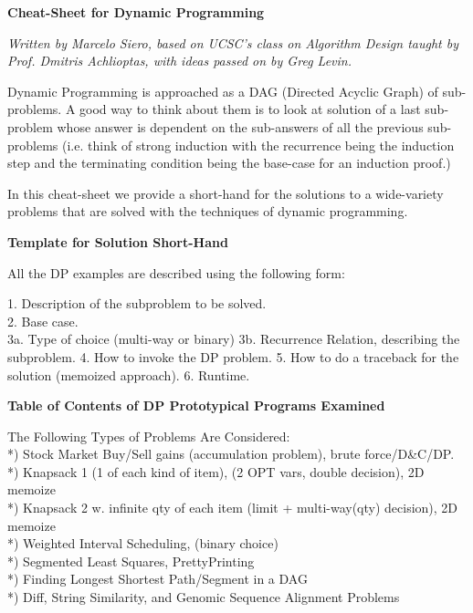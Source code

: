 
{\bf \huge Cheat-Sheet for Dynamic Programming} 

{\small \em Written by Marcelo Siero, based on UCSC's class on Algorithm Design
taught by Prof. Dmitris Achlioptas, with ideas passed on by Greg Levin.}

Dynamic Programming is approached as a DAG (Directed Acyclic Graph) of sub-problems.  
A good way to think about them is to look at solution of a last sub-problem whose 
answer is dependent on the sub-answers of all the previous sub-problems (i.e. think 
of strong induction with the recurrence being the induction step and the terminating 
condition being the base-case for an induction proof.)

In this cheat-sheet we provide a short-hand for the solutions to a wide-variety
problems that are solved with the techniques of dynamic programming.
   

{\bf \Large Template for Solution Short-Hand }

All the DP examples are described using the following form:

1. Description of the subproblem to be solved.\\
2. Base case.\\
3a. Type of choice (multi-way or binary)
3b. Recurrence Relation, describing the subproblem.
4. How to invoke the DP problem.
5. How to do a traceback for the solution (memoized approach).
6. Runtime. 

{\bf \Large Table of Contents of DP Prototypical Programs Examined}

The Following Types of Problems Are Considered:\\

*) Stock Market Buy/Sell gains (accumulation problem), brute force/D\&C/DP.\\
*) Knapsack 1 (1 of each kind of item), (2 OPT vars, double decision), 2D memoize\\
*) Knapsack 2 w. infinite qty of each item (limit + multi-way(qty) decision), 2D memoize\\
*) Weighted Interval Scheduling, (binary choice)\\
*) Segmented Least Squares, PrettyPrinting \\
*) Finding Longest Shortest Path/Segment in a DAG \\
*) Diff, String Similarity, and Genomic Sequence Alignment Problems

